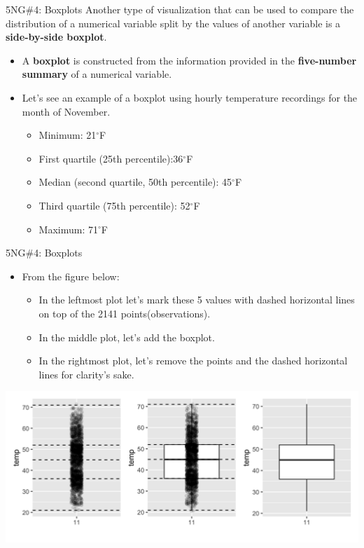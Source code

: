 \documentclass[
  ignorenonframetext,
]{beamer}
\providecommand{\tightlist}{%
  \setlength{\itemsep}{0pt}\setlength{\parskip}{0pt}}
\begin{document}
\begin{frame}{5NG\#4: Boxplots}
\protect\hypertarget{ng4-boxplots}{}
Another type of visualization that can be used to compare the
distribution of a numerical variable split by the values of another
variable is a \textbf{side-by-side boxplot}.

\begin{itemize}
\item
  A \textbf{boxplot} is constructed from the information provided in the
  \textbf{five-number summary} of a numerical variable.
\item
  Let's see an example of a boxplot using hourly temperature recordings
  for the month of November.

  \begin{itemize}
  \tightlist
  \item
    Minimum: 21\(^{\circ}\)F
  \item
    First quartile (25th percentile):36\(^{\circ}\)F
  \item
    Median (second quartile, 50th percentile): 45\(^{\circ}\)F
  \item
    Third quartile (75th percentile): 52\(^{\circ}\)F
  \item
    Maximum: 71\(^{\circ}\)F
  \end{itemize}
\end{itemize}
\end{frame}

\begin{frame}{5NG\#4: Boxplots}
\protect\hypertarget{ng4-boxplots-1}{}
\begin{itemize}
\item
  From the figure below:

  \begin{itemize}
  \tightlist
  \item
    In the leftmost plot let's mark these 5 values with dashed
    horizontal lines on top of the 2141 points(observations).
  \item
    In the middle plot, let's add the boxplot.
  \item
    In the rightmost plot, let's remove the points and the dashed
    horizontal lines for clarity's sake.
  \end{itemize}
\end{itemize}

\tiny

\begin{center}\includegraphics[width=0.7\linewidth,height=0.5\textheight]{Week2_3} \end{center}
\normalsize
\end{frame}
\end{document}
